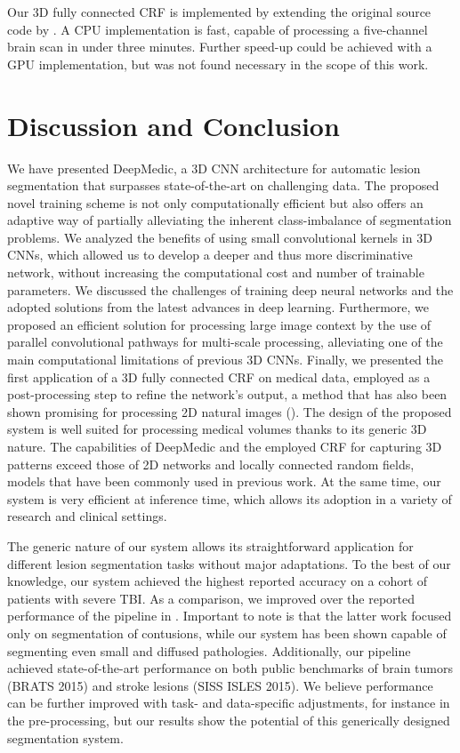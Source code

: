 \documentclass[preprint,authoryear,12pt]{elsarticle}
\begin{document}
Our 3D fully connected CRF is implemented by extending the original source code by \cite{Krahenbuhl2013}. A CPU implementation is fast, capable of processing a five-channel brain scan in under three minutes. Further speed-up could be achieved with a GPU implementation, but was not found necessary in the scope of this work.
 





\section{Discussion and Conclusion}
\label{sec:discussion}



We have presented DeepMedic, a 3D CNN architecture for automatic lesion segmentation that surpasses state-of-the-art on challenging data. The proposed novel training scheme is not only computationally efficient but also offers an adaptive way of partially alleviating the inherent class-imbalance of segmentation problems. We analyzed the benefits of using small convolutional kernels in 3D CNNs, which allowed us to develop a deeper and thus more discriminative network, without increasing the computational cost and number of trainable parameters. We discussed the challenges of training deep neural networks and the adopted solutions from the latest advances in deep learning. Furthermore, we proposed an efficient solution for processing large image context by the use of parallel convolutional pathways for multi-scale processing, alleviating one of the main computational limitations of previous 3D CNNs. Finally, we presented the first application of a 3D fully connected CRF on medical data, employed as a post-processing step to refine the network's output, a method that has also been shown promising for processing 2D natural images (\cite{chen2014semantic}). The design of the proposed system is well suited for processing medical volumes thanks to its generic 3D nature. The capabilities of DeepMedic and the employed CRF for capturing 3D patterns exceed those of 2D networks and locally connected random fields, models that have been commonly used in previous work. At the same time, our system is very efficient at inference time, which allows its adoption in a variety of research and clinical settings.

The generic nature of our system allows its straightforward application for different lesion segmentation tasks without major adaptations. To the best of our knowledge, our system achieved the highest reported accuracy on a cohort of patients with severe TBI. As a comparison, we improved over the reported performance of the pipeline in \cite{Rao2014b}. Important to note is that the latter work focused only on segmentation of contusions, while our system has been shown capable of segmenting even small and diffused pathologies. Additionally, our pipeline achieved state-of-the-art performance on both public benchmarks of brain tumors (BRATS 2015) and stroke lesions (SISS ISLES 2015). We believe performance can be further improved with task- and data-specific adjustments, for instance in the pre-processing, but our results show the potential of this generically designed segmentation system.
\end{document}
